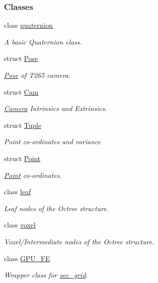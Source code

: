 \subsubsection*{Classes}
\begin{DoxyCompactItemize}
\item 
class \hyperlink{classquaternion}{quaternion}
\begin{DoxyCompactList}\small\item\em A basic Quaternion class. \end{DoxyCompactList}\item 
struct \hyperlink{structPose}{Pose}
\begin{DoxyCompactList}\small\item\em \hyperlink{structPose}{Pose} of T265 camera. \end{DoxyCompactList}\item 
struct \hyperlink{structCam}{Cam}
\begin{DoxyCompactList}\small\item\em \hyperlink{classCamera}{Camera} Intrinsics and Extrinsics. \end{DoxyCompactList}\item 
struct \hyperlink{structTuple}{Tuple}
\begin{DoxyCompactList}\small\item\em Point co-\/ordinates and variance \end{DoxyCompactList}\item 
struct \hyperlink{structPoint}{Point}
\begin{DoxyCompactList}\small\item\em \hyperlink{structPoint}{Point} co-\/ordinates. \end{DoxyCompactList}\item 
class \hyperlink{classleaf}{leaf}
\begin{DoxyCompactList}\small\item\em Leaf nodes of the Octree structure. \end{DoxyCompactList}\item 
class \hyperlink{classvoxel}{voxel}
\begin{DoxyCompactList}\small\item\em Voxel/\+Intermediate nodes of the Octree structure. \end{DoxyCompactList}\item 
class \hyperlink{classGPU__FE}{G\+P\+U\+\_\+\+FE}
\begin{DoxyCompactList}\small\item\em Wrapper class for \hyperlink{classocc__grid}{occ\+\_\+grid}. \end{DoxyCompactList}\end{DoxyCompactItemize}
